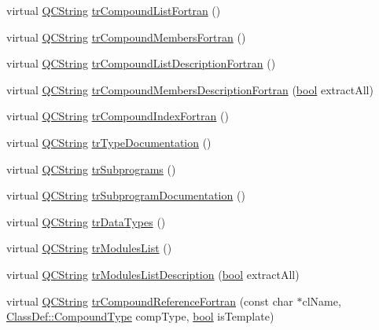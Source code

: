 \begin{DoxyCompactItemize}
virtual \hyperlink{class_q_c_string}{Q\+C\+String} \hyperlink{class_translator_macedonian_ac7f1d2e172ebc00b325a67d3851b1851}{tr\+Compound\+List\+Fortran} ()
\item 
virtual \hyperlink{class_q_c_string}{Q\+C\+String} \hyperlink{class_translator_macedonian_ac1bffd6416f8e830325425beed610671}{tr\+Compound\+Members\+Fortran} ()
\item 
virtual \hyperlink{class_q_c_string}{Q\+C\+String} \hyperlink{class_translator_macedonian_a0445b7b88cb25d52e725abd2d252860b}{tr\+Compound\+List\+Description\+Fortran} ()
\item 
virtual \hyperlink{class_q_c_string}{Q\+C\+String} \hyperlink{class_translator_macedonian_a7ea39ab9ec65c73c0af7fbbc113d3f03}{tr\+Compound\+Members\+Description\+Fortran} (\hyperlink{qglobal_8h_a1062901a7428fdd9c7f180f5e01ea056}{bool} extract\+All)
\item 
virtual \hyperlink{class_q_c_string}{Q\+C\+String} \hyperlink{class_translator_macedonian_a332ca0f326cf962e09d5cc1a9ef407a8}{tr\+Compound\+Index\+Fortran} ()
\item 
virtual \hyperlink{class_q_c_string}{Q\+C\+String} \hyperlink{class_translator_macedonian_a45df65a66ff10498ef77c8a8eb0e06a7}{tr\+Type\+Documentation} ()
\item 
virtual \hyperlink{class_q_c_string}{Q\+C\+String} \hyperlink{class_translator_macedonian_ac418532b8c2560eacf53cc5faa2be2c5}{tr\+Subprograms} ()
\item 
virtual \hyperlink{class_q_c_string}{Q\+C\+String} \hyperlink{class_translator_macedonian_a04ac781c3d7e2712b6636af7b543c04f}{tr\+Subprogram\+Documentation} ()
\item 
virtual \hyperlink{class_q_c_string}{Q\+C\+String} \hyperlink{class_translator_macedonian_acc5a393e1abb3dfcc5ff2d11b357c585}{tr\+Data\+Types} ()
\item 
virtual \hyperlink{class_q_c_string}{Q\+C\+String} \hyperlink{class_translator_macedonian_a7ba6ccaadaf2451e97c30e4cf1f9fe22}{tr\+Modules\+List} ()
\item 
virtual \hyperlink{class_q_c_string}{Q\+C\+String} \hyperlink{class_translator_macedonian_acc0fc8935f235a8c96e1bc7cd6d83e94}{tr\+Modules\+List\+Description} (\hyperlink{qglobal_8h_a1062901a7428fdd9c7f180f5e01ea056}{bool} extract\+All)
\item 
virtual \hyperlink{class_q_c_string}{Q\+C\+String} \hyperlink{class_translator_macedonian_a9af65190c5529cb48b130d1c57ac79e0}{tr\+Compound\+Reference\+Fortran} (const char $\ast$cl\+Name, \hyperlink{class_class_def_ae70cf86d35fe954a94c566fbcfc87939}{Class\+Def\+::\+Compound\+Type} comp\+Type, \hyperlink{qglobal_8h_a1062901a7428fdd9c7f180f5e01ea056}{bool} is\+Template)

\end{DoxyCompactItemize}
